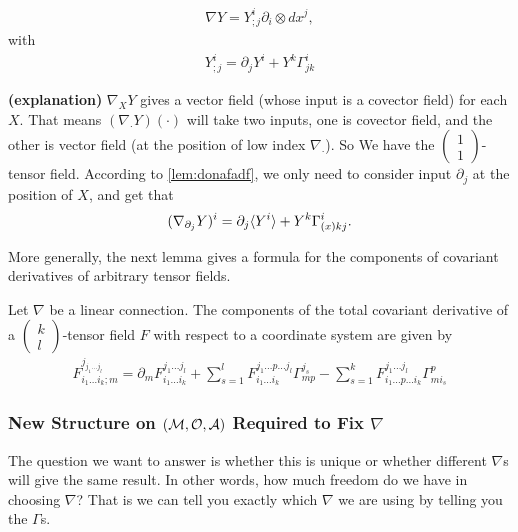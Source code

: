 \documentclass[12pt]{article} %
\newcommand{\bfs}[1]{\textbf{({#1}) }}
\begin{document}
\begin{align*}
\nabla Y=Y_{; j}^{i} \partial_{i} \otimes d x^{j},
\end{align*}
with
\begin{align*}
Y_{; j}^{i}=\partial_{j} Y^{i}+Y^{k} \Gamma_{j k}^{i}
\end{align*}
\begin{rema}\bfs{explanation}
$\nabla_X Y$ gives a vector field (whose input is a covector field) for each $X$. That means $(\nabla_{\cdot} Y)(\cdot)$ will take two inputs,  one is covector field, and the other is vector field (at the position of low index $\nabla_{\cdot}$). So We have the $\left(\begin{array}{l}1 \\ 1\end{array}\right)$-tensor field. According to \cref{lem:donafadf}, we only need to consider input $\partial_j$ at the position of $X$, and get that 
\begin{align*} 
    (\nabla_{\partial_j}Y)^i = \partial_j\langle Y^i\rangle + Y^k \Gamma^i_{(x)kj}.
\end{align*} 
\end{rema}
More generally, the next lemma gives a formula for the components of covariant derivatives of arbitrary tensor fields.

\begin{lema}
Let $\nabla$ be a linear connection. The components of the total covariant derivative of a $\left(\begin{array}{l}k \\ l\end{array}\right)$-tensor field $F$ with respect to a coordinate system are given by
\begin{align*}
F_{i_{1} \ldots i_{k} ; m}^{j_{j_{1} \ldots j_{l}}}=\partial_{m} F_{i_{1} \ldots i_{k}}^{j_{1} \ldots j_{l}}+\sum_{s=1}^{l} F_{i_{1} \ldots i_{k}}^{j_{1} \ldots p \ldots j_{l}} \Gamma_{m p}^{j_{s}}-\sum_{s=1}^{k} F_{i_{1} \ldots p \ldots i_{k}}^{j_{1} \ldots j_{l}} \Gamma_{m i_{s}}^{p}
\end{align*}
\end{lema}

\subsubsection{New Structure on $(\mathcal{M},\mathcal{O},\mathcal{A})$ Required to Fix $\nabla$}
The question we want to answer is whether this is unique or whether different $\nabla$s will give the same result. In other words, how much freedom do we have in choosing $\nabla$? That is we can tell you exactly which $\nabla$ we are using by telling you the $\Gamma$s. 
\end{document}

